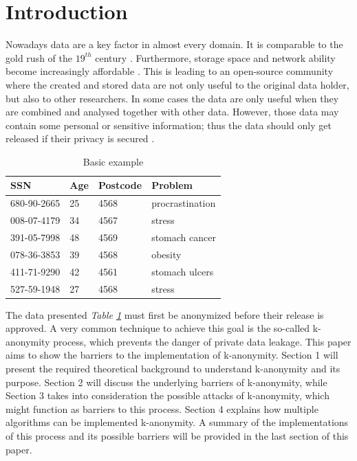 \documentclass{llncs}
\begin{document}
\section{Introduction}
%
Nowadays data are a key factor in almost every domain. It is comparable to the gold rush of the $19^{th}$ century \cite{datarevo}. Furthermore, storage space and network ability become increasingly affordable \cite{sweeney2002k}. 
This is leading to an open-source community where the created and stored data are not only useful to the original data holder, but also to other researchers. In some cases the data are only useful when they are combined and analysed together with other data. However, those data may contain some personal or sensitive information; thus the data should only get released if their privacy is secured  \cite{li2006achieving}.\\
\begin{table}[]
	\centering
	\caption{Basic example}
	\label{intro_example}
	\begin{tabular}{@{}llll@{}}
		\toprule
		SSN         & Age & Postcode & Problem         \\ \midrule
		680-90-2665 & 25  & 4568     & procrastination \\
		008-07-4179 & 34  & 4567     & stress          \\
		391-05-7998 & 48  & 4569     & stomach cancer  \\
		078-36-3853 & 39  & 4568     & obesity         \\
		411-71-9290 & 42  & 4561     & stomach ulcers  \\
		527-59-1948 & 27  & 4568     & stress          \\ \bottomrule
	\end{tabular}
\end{table}

The data presented \textit{Table \ref{intro_example}} must first be anonymized before their release is approved. A very common technique to achieve this goal is the so-called k-anonymity process, which prevents the danger of private data leakage. This paper aims to show the barriers to the implementation of k-anonymity. Section 1 will present the required theoretical background to understand k-anonymity and its purpose. Section 2 will discuss the underlying barriers of k-anonymity, while Section 3 takes into consideration the possible attacks of k-anonymity, which might function as barriers to this process. Section 4 explains how multiple algorithms can be implemented k-anonymity. A summary of the implementations of this process and its possible barriers  will be provided in the last section of this paper.
\newpage
\end{document}
